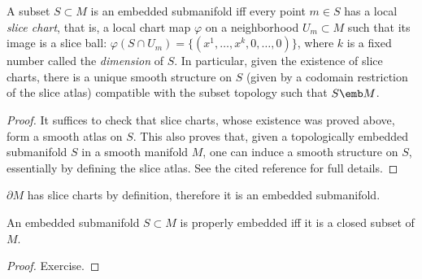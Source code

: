 \begin{prop}
    A subset $S\subset M$ is an embedded submanifold iff every point $m\in S$ has a local \emph{slice chart}, that is, a local chart map $\varphi$ on a neighborhood $U_m\subset M$  such that its image is a slice ball: $\varphi(S\cap U_m)=\{(x^1,\ldots,x^k,0,\ldots,0)\}$, where $k$ is a fixed number called the \emph{dimension} of $S$. In particular, given the existence of slice charts, there is a unique smooth structure on $S$ (given by a codomain restriction of the slice atlas) compatible with the subset topology such that $S\emb M$.
\end{prop}
\begin{proof}
    It suffices to check that slice charts, whose existence was proved above, form a smooth atlas on $S$. This also proves that, given a topologically embedded submanifold $S$ in a smooth manifold $M$, one can induce a smooth structure on $S$, essentially by defining the slice atlas. See the cited reference for full details.
\end{proof}


\begin{cor}
    $\partial M$ has slice charts by definition, therefore it is an embedded submanifold.
\end{cor}

\begin{prop}
    An embedded submanifold  $S\subset M$ is properly embedded iff it is a closed subset of $M$.
\end{prop}
\begin{proof}
    Exercise.
\end{proof}

